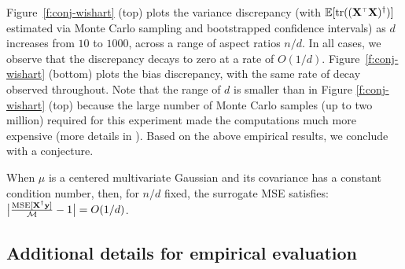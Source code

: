 Figure~\ref{f:conj-wishart} (top) plots the variance discrepancy (with
$\E[\tr((\X^\top\X)^\dagger)]$ estimated via Monte Carlo
sampling and bootstrapped confidence intervals) as $d$ increases from $10$ to
$1000$, across a range of aspect ratios $n/d$. In all cases, we observe that
the discrepancy decays to zero at a rate of $O(1/d)$.
Figure~\ref{f:conj-wishart} (bottom) plots the bias discrepancy, with the same
rate of decay observed throughout.  Note that the range of $d$ is smaller than
in Figure \ref{f:conj-wishart} (top) because the large number of Monte Carlo
samples (up to two million) required for this experiment made the computations
much more expensive (more details in ). Based on the
above empirical results, we conclude with a conjecture.
\begin{conjecture}
  \label{c:1-over-d-rate}
  When $\mu$ is a centered multivariate Gaussian and its covariance
  has a constant condition
  number, then, for $n/d$ fixed, the surrogate MSE satisfies:
  $\big|\frac{\textnormal{MSE}[\mathbf X^\dagger\mathbf y]}{\mathcal M}-1\big|= O(1/d)$.
\end{conjecture}




\subsection{Additional details for empirical evaluation}
\label{a:empirical}

